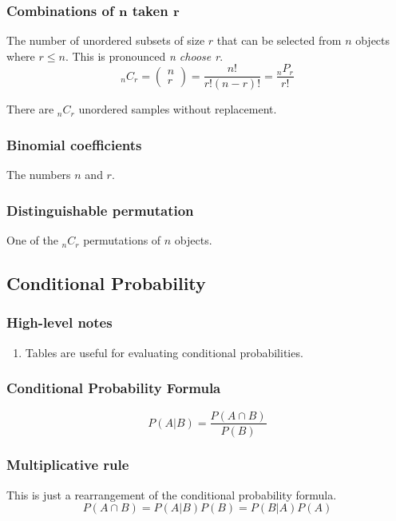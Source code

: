 \documentclass{article}
\begin{document}
\begin{multicols*}{2}
\subsubsection{Combinations of $\mathbf{n}$ taken $\mathbf{r}$}
The number of unordered subsets of size $r$ that can be selected from $n$ objects where $r \leq n$. This is pronounced \textit{n choose r}.
\[{}_n C_r = \begin{pmatrix}
    n \\
    r
\end{pmatrix} = \frac{n!}{r! (n-r)!} = \frac{{}_n P_r}{r!}\]

There are ${}_n C_r$ unordered samples without replacement.

\subsubsection{Binomial coefficients}
The numbers $n$ and $r$.

\subsubsection{Distinguishable permutation}
One of the ${}_n C_r$ permutations of $n$ objects.

\subsection{Conditional Probability}

\subsubsection{High-level notes}
\begin{enumerate}
    \item Tables are useful for evaluating conditional probabilities.
\end{enumerate}

\subsubsection{Conditional Probability Formula}
\begin{equation*}
    P(A|B) = \frac{P(A \cap B)}{P(B)}
\end{equation*}

\subsubsection{Multiplicative rule}
This is just a rearrangement of the conditional probability formula.
\begin{equation*}
    P(A \cap B) = P(A|B) P(B) = P(B|A) P(A)
\end{equation*}


\end{multicols*}
\end{document}
